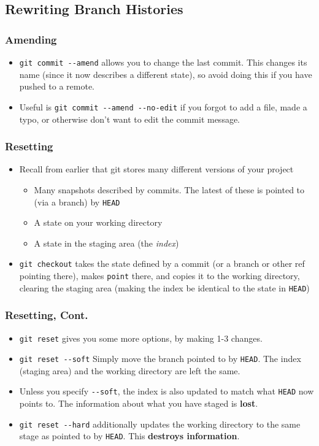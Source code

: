\documentclass{beamer}
\begin{document}
\subsection{Rewriting Branch Histories}

\begin{frame}[fragile]
\frametitle{Amending}
\begin{itemize}
\item \lstinline{git commit --amend} allows you to change the last commit. This changes its name (since it now describes a different state), so avoid doing this if you have pushed to a remote.
\item Useful is \lstinline{git commit --amend --no-edit} if you forgot to add a file, made a typo, or otherwise don't want to edit the commit message.
\end{itemize}
\end{frame}

\begin{frame}[fragile]
\frametitle{Resetting}
\begin{itemize}
\item Recall from earlier that git stores many different versions of your project
\begin{itemize}
\item Many snapshots described by commits. The latest of these is pointed to (via a branch) by \texttt{HEAD}
\item A state on your working directory
\item A state in the staging area (the \emph{index})
\end{itemize}
\item \lstinline{git checkout} takes the state defined by a commit (or a branch or other ref pointing there), makes \lstinline{point} there, and copies it to the working directory, clearing the staging area (making the index be identical to the state in \lstinline{HEAD})
\end{itemize}
\end{frame}

\begin{frame}[fragile]
\frametitle{Resetting, Cont.}
\begin{itemize}
\item \lstinline{git reset} gives you some more options, by making 1-3 changes.
\item \lstinline{git reset --soft} Simply move the branch pointed to by \lstinline{HEAD}. The index (staging area) and the working directory are left the same.
\item Unless you specify \lstinline{--soft}, the index is also updated to match what \lstinline{HEAD} now points to. The information about what you have staged is \textbf{lost}.
\item \lstinline{git reset --hard} additionally updates the working directory to the same stage as pointed to by \lstinline{HEAD}. This \textbf{destroys information}.
\end{itemize}
\end{frame}
\end{document}
